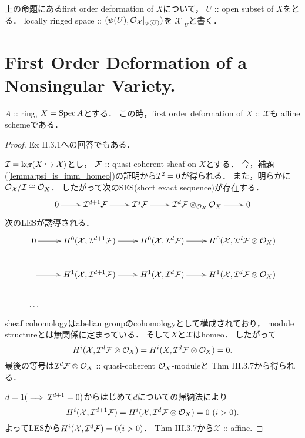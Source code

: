 \documentclass[a4paper]{jsarticle}
\newcommand{\famX}{\mathcal{X}}
\begin{document}
    \begin{Def}
        上の命題にあるfirst order deformation of $X$について，
        $U$ :: open subset of $X$をとる．
        locally ringed space :: $(\psi(U), \shO_{\famX}|_{\psi(U)})$を
        $\famX|_U$と書く．
    \end{Def}

\section{First Order Deformation of a Nonsingular Variety.}
    \begin{Lemma}
        $A$ :: ring, $X=\operatorname{Spec} A$とする．
        この時，first order deformation of $X$ :: $\famX$も
        affine schemeである．
    \end{Lemma}
    \begin{proof}
        \cite{HarAG} Ex II.3.1への回答でもある．
        
        $\shI=\ker(X \inclmap \famX)$とし，
        $\mathcal{F}$ :: quasi-coherent sheaf on $X$とする．
        今，補題(\ref{lemma:psi_is_imm_homeo})の証明から$\mathcal{I}^2=0$が得られる．
        また，明らかに$\shO_{\famX}/\shI \iso \shO_{X}$．
        したがって次のSES(short exact sequence)が存在する．
        \[\xymatrix{
            0 \ar[r]& \shI^{d+1} \shF \ar[r]& \shI^{d} \shF \ar[r]&
                \shI^{d}\shF \otimes_{\shO_{\famX}} \shO_X \ar[r]& 0
        }\]
        次のLESが誘導される．
        \[\xymatrix{
            0 \ar[r]& H^0(\famX, \shI^{d+1} \shF) \ar[r]& H^0(\famX, \shI^{d} \shF) \ar[r]& H^0(\famX, \shI^{d}\shF \otimes \shO_X) \\
            {}\ar[r]& H^1(\famX, \shI^{d+1} \shF) \ar[r]& H^1(\famX, \shI^{d} \shF) \ar[r]& H^1(\famX, \shI^{d}\shF \otimes \shO_X) \\
            \dots
        }\]
        
        sheaf cohomologyはabelian groupのcohomologyとして構成されており，
        module structureとは無関係に定まっている．
        そして$X$と$\famX$はhomeo．
        したがって
        \[ H^i(\famX, \shI^{d}\shF \otimes \shO_X)=H^i(X, \shI^{d}\shF \otimes \shO_X)=0. \]
        最後の等号は$\mathcal{I}^{d}\mathcal{F} \otimes \mathcal{O}_X$ :: quasi-coherent $\mathcal{O}_X$-moduleと
        \cite{HarAG} Thm III.3.7から得られる．
        
        $d=1 (\implies \mathcal{I}^{d+1}=0)$からはじめて$d$についての帰納法により
        \[ H^i(\famX, \shI^{d+1} \shF)=H^i(\famX, \shI^{d}\shF \otimes \shO_X)=0 \ (i>0). \]
        よってLESから$H^i(\famX, \shI^{d} \shF)=0 (i>0)$．
        \cite{HarAG} Thm III.3.7から$\famX$ :: affine.
    \end{proof}
\end{document}
